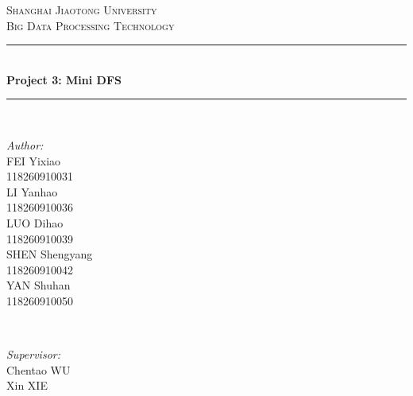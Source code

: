 \documentclass[10pt]{article}
\begin{document}
\begin{titlepage}

\newcommand{\HRule}{\rule{\linewidth}{0.5mm}} %

\center %


\textsc{\LARGE Shanghai Jiaotong University}\\[1.5cm] %
\textsc{\Large Big Data Processing Technology}\\[0.5cm] %


\HRule \\[0.4cm]
{ \huge \bfseries Project 3: Mini DFS}\\[0.4cm] %
\HRule \\[1.5cm]


\begin{minipage}{0.4\textwidth}
\begin{flushleft} \large
\emph{Author:}\\
FEI Yixiao \\118260910031\\
LI Yanhao \\118260910036\\
LUO Dihao \\118260910039\\ %
SHEN Shengyang \\118260910042\\
YAN Shuhan \\118260910050\\ %
\end{flushleft}
\end{minipage}
~
\begin{minipage}{0.4\textwidth}
\begin{flushright} \large
\emph{Supervisor:} \\
Chentao  \textsc{WU} \\%
Xin  \textsc{XIE}
\end{flushright}
\end{minipage}\\[2cm]


\end{titlepage}
\end{document}
